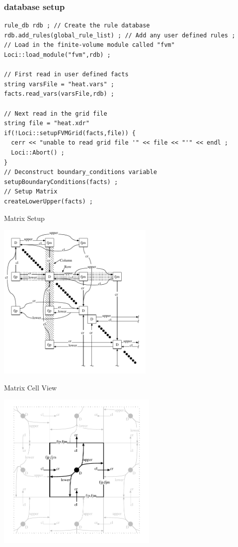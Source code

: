 \documentclass{beamer}
\begin{document}
\begin{frame}[fragile=singleslide]\frametitle{database setup}
\scriptsize
\begin{verbatim}
rule_db rdb ; // Create the rule database
rdb.add_rules(global_rule_list) ; // Add any user defined rules ;
// Load in the finite-volume module called "fvm"
Loci::load_module("fvm",rdb) ;

// First read in user defined facts
string varsFile = "heat.vars" ;
facts.read_vars(varsFile,rdb) ;

// Next read in the grid file
string file = "heat.xdr"
if(!Loci::setupFVMGrid(facts,file)) {
  cerr << "unable to read grid file '" << file << "'" << endl ;
  Loci::Abort() ;
}
// Deconstruct boundary_conditions variable
setupBoundaryConditions(facts) ;
// Setup Matrix
createLowerUpper(facts) ;
\end{verbatim}
\end{frame}
\begin{frame}{Matrix Setup}
\begin{center}
\includegraphics[height=3in]{Figures/mat}
\end{center}
\end{frame}
\begin{frame}{Matrix Cell View}
\begin{center}
\includegraphics[height=3in]{Figures/cell}
\end{center}
\end{frame}
\end{document}

